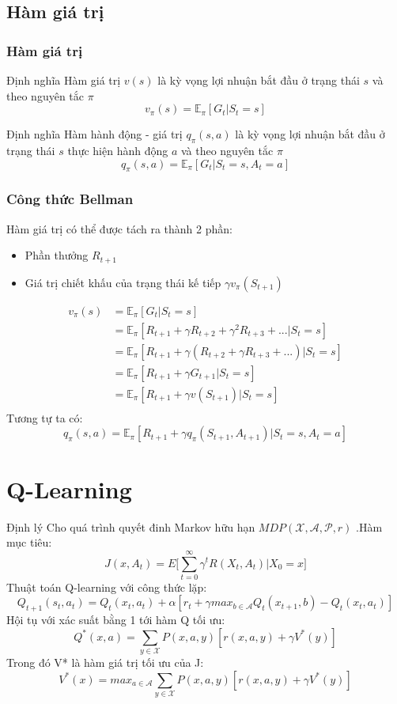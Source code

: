 \documentclass{beamer}
\begin{document}
\subsection{Hàm giá trị}

\begin{frame}
\frametitle{Hàm giá trị}
\begin{block}{Định nghĩa}
Hàm giá trị $v(s)$ là kỳ vọng lợi nhuận bắt đầu ở trạng thái $s$ và theo nguyên tắc $\pi$
$$v_\pi (s)=\mathbb{E}_\pi [G_t|S_t=s]$$
\end{block}

\begin{block}{Định nghĩa}
Hàm hành động - giá trị $q_\pi (s,a)$ là kỳ vọng lợi nhuận bắt đầu ở trạng thái $s$ thực hiện hành động $a$ và theo nguyên tắc $\pi$
$$q_\pi (s,a)=\mathbb{E}_\pi [G_t|S_t=s,A_t=a]$$
\end{block}
\end{frame}

\begin{frame}
\frametitle{Công thức Bellman}
Hàm giá trị có thể được tách ra thành 2 phần:
\begin{itemize}
\item Phần thưởng $R_{t+1}$
\item Giá trị chiết khấu của trạng thái kế tiếp $\gamma v_\pi (S_{t+1})$
\end{itemize}
\begin{equation}
\begin{split}
v_\pi (s) & = \mathbb{E}_\pi [G_t|S_t = s] \\
& = \mathbb{E}_\pi [R_{t+1} + \gamma R_{t+2} + \gamma^2 R_{t+3} + ... | S_t = s] \\
& = \mathbb{E}_\pi [R_{t+1} + \gamma (R_{t+2} + \gamma R_{t+3} + ...) | S_t = s] \\
& = \mathbb{E}_\pi [R_{t+1} + \gamma G_{t+1} | S_t = s] \\
& = \mathbb{E}_\pi [R_{t+1} + \gamma v(S_{t+1}) | S_t = s] \\
\end{split}
\end{equation}
Tương tự ta có:
$$q_\pi (s,a) = \mathbb{E}_\pi [R_{t+1} + \gamma q_\pi (S_{t+1},A_{t+1}) | S_t = s, A_t =a]$$
\end{frame}

\section{Q-Learning}
\begin{frame}
\begin{block}{Định lý}
Cho quá trình quyết đinh Markov hữu hạn $MDP(\mathcal{X},\mathcal{A},\mathcal{P},r)$
.Hàm mục tiêu:
$$J(x,{A_t})=E\big[ \sum_{t=0}^\infty{\gamma^t R(X_t,A_t)|X_0=x} \big]$$
Thuật toán Q-learning với công thức lặp:
$$Q_{t+1}(s_t,a_t)=Q_t(x_t,a_t)+\alpha[r_t +\gamma max_{b \in \mathcal{A}}Q_t(x_{t+1},b)-Q_t(x_t,a_t)]$$
Hội tụ với xác suất bằng 1 tới hàm Q tối ưu:
$$Q^*(x,a)=\sum_{y\in\mathcal{X}}{P(x,a,y)[r(x,a,y)+\gamma V^*(y)]}$$
Trong đó V* là hàm giá trị tối ưu của J:
$$V^*(x)=max_{a\in\mathcal{A}}\sum_{y\in\mathcal{X}}{P(x,a,y)[r(x,a,y)+\gamma V^*(y)]}$$
\end{block}
\end{frame}
\end{document}
